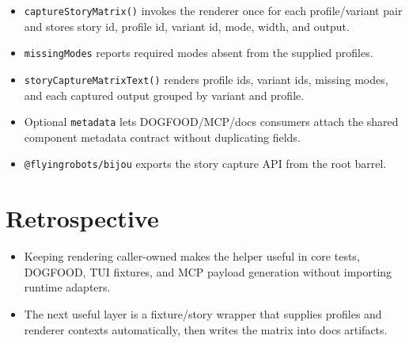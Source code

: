 \begin{itemize}
\tightlist
\item
  \texttt{c\allowbreak{}a\allowbreak{}p\allowbreak{}t\allowbreak{}u\allowbreak{}r\allowbreak{}e\allowbreak{}S\allowbreak{}t\allowbreak{}o\allowbreak{}r\allowbreak{}y\allowbreak{}M\allowbreak{}a\allowbreak{}t\allowbreak{}r\allowbreak{}i\allowbreak{}x\allowbreak{}(\allowbreak{})} invokes the renderer once for each profile/variant pair and stores story id, profile id, variant id, mode, width, and output.
\item
  \texttt{m\allowbreak{}i\allowbreak{}s\allowbreak{}s\allowbreak{}i\allowbreak{}n\allowbreak{}g\allowbreak{}M\allowbreak{}o\allowbreak{}d\allowbreak{}e\allowbreak{}s} reports required modes absent from the supplied profiles.
\item
  \texttt{s\allowbreak{}t\allowbreak{}o\allowbreak{}r\allowbreak{}y\allowbreak{}C\allowbreak{}a\allowbreak{}p\allowbreak{}t\allowbreak{}u\allowbreak{}r\allowbreak{}e\allowbreak{}M\allowbreak{}a\allowbreak{}t\allowbreak{}r\allowbreak{}i\allowbreak{}x\allowbreak{}T\allowbreak{}e\allowbreak{}x\allowbreak{}t\allowbreak{}(\allowbreak{})} renders profile ids, variant ids, missing modes, and each captured output grouped by variant and profile.
\item
  Optional \texttt{m\allowbreak{}e\allowbreak{}t\allowbreak{}a\allowbreak{}d\allowbreak{}a\allowbreak{}t\allowbreak{}a} lets DOGFOOD/MCP/docs consumers attach the shared component metadata contract without duplicating fields.
\item
  \texttt{@\allowbreak{}f\allowbreak{}l\allowbreak{}y\allowbreak{}i\allowbreak{}n\allowbreak{}g\allowbreak{}r\allowbreak{}o\allowbreak{}b\allowbreak{}o\allowbreak{}t\allowbreak{}s\allowbreak{}/\allowbreak{}b\allowbreak{}i\allowbreak{}j\allowbreak{}o\allowbreak{}u} exports the story capture API from the root barrel.
\end{itemize}

\section{Retrospective}\label{record-089-retrospective}

\begin{itemize}
\tightlist
\item
  Keeping rendering caller-owned makes the helper useful in core tests, DOGFOOD, TUI fixtures, and MCP payload generation without importing runtime adapters.
\item
  The next useful layer is a fixture/story wrapper that supplies profiles and renderer contexts automatically, then writes the matrix into docs artifacts.
\end{itemize}


